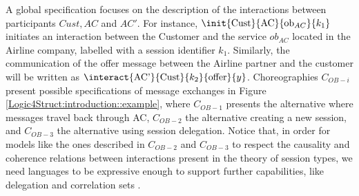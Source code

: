   A global specification focuses on the description of the
  interactions between participants $Cust, AC$ and $AC'$. For
  instance, $\init{\text{Cust}}{\text{AC}}{\text{ob}_{AC}}{k_1} $
  initiates an interaction between the Customer and the service
  $ob_{AC}$ located in the Airline company, labelled with a session
  identifier $k_1$. Similarly, the communication of the offer message
  between the Airline partner and the customer will be written as
  $\interact{\text{AC'}}{\text{Cust}}{k_2}{\text{offer}}{y}
  $. Choreographies $C_{OB-i}$ present possible specifications of 
  message exchanges in Figure
  \ref{Logic4Struct:introduction::example}, where  $C_{OB-1}$
  presents the alternative where messages travel back through AC,
  $C_{OB-2}$ the alternative creating a new session, and $C_{OB-3}$
  the alternative using session delegation.
  Notice that, in order for models like the ones described in $C_{OB-2}$
  and $C_{OB-3}$ to respect the causality and coherence relations
  between interactions present in the theory of
  session types, we need languages to
  be expressive enough to support further capabilities, like delegation \cite{honda1998lpa} and correlation sets
  \cite{lapadula7cows}. 


